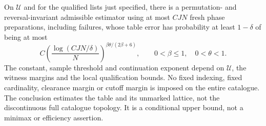 \begin{theorem}
\label{thm:witness-statistical}
On $\mathcal U$ and for the qualified lists just specified, there is a
permutation- and reversal-invariant admissible estimator using at most
$CJN$ fresh phase preparations, including failures, whose table error
has probability at least $1-\delta$ of being at most
\begin{equation}\label{eq:witness-statistical}
 C\left(\frac{\log(CJN/\delta)}{N}\right)^{\beta\theta/(2\beta+6)},
                  \qquad 0<\beta\le1,\quad 0<\theta<1.
\end{equation}
The constant, sample threshold and continuation exponent depend on
$\mathcal U$, the witness margins and the local qualification bounds.
No fixed indexing, fixed cardinality, clearance margin or cutoff margin
is imposed on the entire catalogue. The conclusion estimates the table
and its unmarked lattice, not the discontinuous full catalogue topology.
It is a conditional upper bound, not a minimax or efficiency assertion.
\end{theorem}
